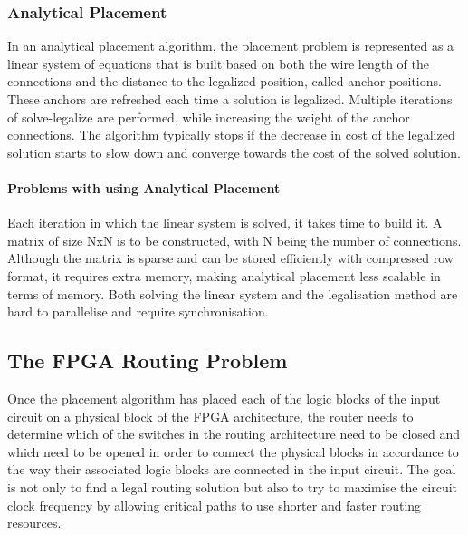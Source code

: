 \documentclass[a4paper,oneside,12pt]{article}
\begin{document}
\subsubsection{Analytical Placement}
In an analytical placement algorithm, the placement problem is represented as a linear system of equations that is built based on both the wire length of the connections and the distance to the legalized position, called anchor positions. These anchors are refreshed each time a solution is legalized.
Multiple iterations of solve-legalize are performed, while increasing the weight of the anchor connections. The algorithm typically stops if the decrease in cost of the legalized solution starts to slow down and converge towards the cost of the solved solution.  %

\paragraph{Problems with using Analytical Placement}
Each iteration in which the linear system is solved, it takes time to build it. A matrix of size NxN is to be constructed, with N being the number of connections. Although the matrix is sparse and can be stored efficiently with compressed row format, it requires extra memory, making analytical placement less scalable in terms of memory.
Both solving the linear system and the legalisation method are hard to parallelise and require synchronisation.

\subsection{The FPGA Routing Problem}
Once the placement algorithm has placed each of the logic blocks of the input circuit on a physical block of the FPGA architecture, the router needs to determine which of the switches in the routing architecture need to be closed and which need to be opened in order to connect the physical blocks in accordance to the way their associated logic blocks are connected in the input circuit. The goal is not only to find a legal routing solution but also to try to maximise the circuit clock frequency by allowing critical paths to use shorter and faster routing resources.
\end{document}
